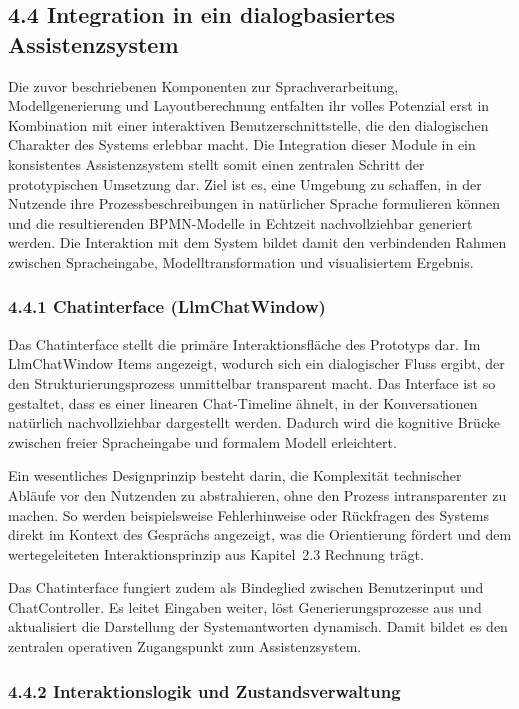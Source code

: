 \documentclass[a4paper,12pt]{scrreprt}
\begin{document}
\subsection*{4.4 Integration in ein dialogbasiertes Assistenzsystem}

Die zuvor beschriebenen Komponenten zur Sprachverarbeitung, Modellgenerierung und Layoutberechnung entfalten ihr volles Potenzial erst in Kombination mit einer interaktiven Benutzerschnittstelle, die den dialogischen Charakter des Systems erlebbar macht. Die Integration dieser Module in ein konsistentes Assistenzsystem stellt somit einen zentralen Schritt der prototypischen Umsetzung dar. Ziel ist es, eine Umgebung zu schaffen, in der Nutzende ihre Prozessbeschreibungen in natürlicher Sprache formulieren können und die resultierenden BPMN-Modelle in Echtzeit nachvollziehbar generiert werden. Die Interaktion mit dem System bildet damit den verbindenden Rahmen zwischen Spracheingabe, Modelltransformation und visualisiertem Ergebnis.

\subsubsection*{4.4.1 Chatinterface (LlmChatWindow)}

Das Chatinterface stellt die primäre Interaktionsfläche des Prototyps dar. Im LlmChatWindow Items angezeigt, wodurch sich ein dialogischer Fluss ergibt, der den Strukturierungsprozess unmittelbar transparent macht. Das Interface ist so gestaltet, dass es einer linearen Chat-Timeline ähnelt, in der Konversationen natürlich nachvollziehbar dargestellt werden. Dadurch wird die kognitive Brücke zwischen freier Spracheingabe und formalem Modell erleichtert. 

Ein wesentliches Designprinzip besteht darin, die Komplexität technischer Abläufe vor den Nutzenden zu abstrahieren, ohne den Prozess intransparenter zu machen. So werden beispielsweise Fehlerhinweise oder Rückfragen des Systems direkt im Kontext des Gesprächs angezeigt, was die Orientierung fördert und dem wertegeleiteten Interaktionsprinzip aus Kapitel~2.3 Rechnung trägt.

Das Chatinterface fungiert zudem als Bindeglied zwischen Benutzerinput und ChatController. Es leitet Eingaben weiter, löst Generierungsprozesse aus und aktualisiert die Darstellung der Systemantworten dynamisch. Damit bildet es 
den zentralen operativen Zugangspunkt zum Assistenzsystem.

\subsubsection*{4.4.2 Interaktionslogik und Zustandsverwaltung}
\end{document}
